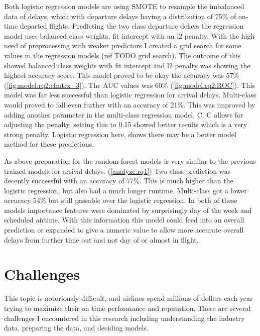 \documentclass[a4paper,12pt]{article}
\begin{document}
Both logistic regression models are using SMOTE to resample the imbalanced data of delays, which with departure delays having a distribution of 
75\% of on-time departed flights. Predicting the two class departure delays the regression model uses balanced class weights, fit intercept with an l2 penalty.
With the high need of preprocessing with weaker predictors I created a grid search for some values in the regression models (ref TODO grid search).
The outcome of this showed balanced class weights with fit intercept and l2 penalty was showing the highest accuracy score. This model proved to be okay the accuracy was 57\% (\ref{fig:model:rq2:cfmtrx_3}).
The AUC values was 60\% (\ref{fig:model:rq2:ROC}). This model was far less successful than logistic regression for arrival delays. Multi-class would proved to fall even further with an accuracy of 21\%.
This was improved by adding another parameter in the multi-class regression model, C. C allows for adjusting the penalty, setting this to 0.15 showed better results which is a very
strong penalty. Logistic regression here, shows there may be a better model method for these predictions.

As above preparation for the random forest models is very similar to the previous trained models for arrival delays. (\ref{analyze:rq1})
Two class prediction was decently successful with an accuracy of 77\%. This is much higher than the logistic regression, but also had a much longer runtime.
Multi-class got a lower accuracy 54\% but still passable over the logistic regression. In both of these models importance features were dominated by surprisingly day of the week 
and scheduled airtime. With this information this model could feed into an overall prediction or expanded to give a numeric value to allow more accurate overall delays from further time out and not 
day of or almost in flight.


\pagebreak

\section{Challenges}

This topic is notoriously difficult, and airlines spend millions of dollars each year trying to maximize their on time performance and reputation.
There are several challenges I encountered in this research including understanding the industry data, preparing the data, and deciding models.
\end{document}

